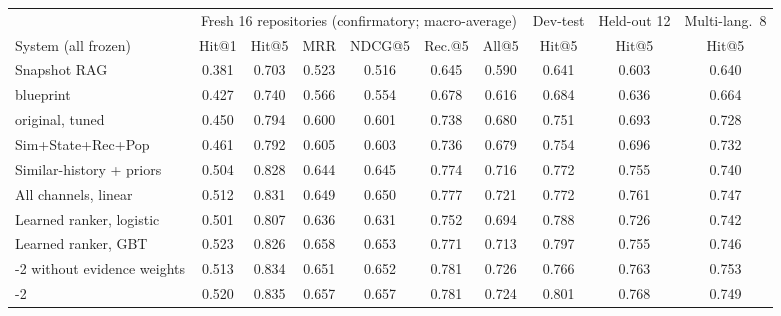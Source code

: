 \begin{tabular}{lcccccc|ccc}
\toprule
 & \multicolumn{6}{c|}{Fresh 16 repositories (confirmatory; macro-average)} & Dev-test & Held-out 12 & Multi-lang.\ 8 \\
System (all frozen) & Hit@1 & Hit@5 & MRR & NDCG@5 & Rec.@5 & All@5 & Hit@5 & Hit@5 & Hit@5 \\
\midrule
Snapshot RAG & 0.381 & 0.703 & 0.523 & 0.516 & 0.645 & 0.590 & 0.641 & 0.603 & 0.640 \\
\midrule
\sys{} blueprint & 0.427 & 0.740 & 0.566 & 0.554 & 0.678 & 0.616 & 0.684 & 0.636 & 0.664 \\
\sys{} original, tuned & 0.450 & 0.794 & 0.600 & 0.601 & 0.738 & 0.680 & 0.751 & 0.693 & 0.728 \\
\midrule
Sim+State+Rec+Pop & 0.461 & 0.792 & 0.605 & 0.603 & 0.736 & 0.679 & 0.754 & 0.696 & 0.732 \\
Similar-history + priors & 0.504 & 0.828 & 0.644 & 0.645 & 0.774 & 0.716 & 0.772 & 0.755 & 0.740 \\
All channels, linear & 0.512 & 0.831 & 0.649 & 0.650 & 0.777 & 0.721 & 0.772 & 0.761 & 0.747 \\
Learned ranker, logistic & 0.501 & 0.807 & 0.636 & 0.631 & 0.752 & 0.694 & 0.788 & 0.726 & 0.742 \\
Learned ranker, GBT & 0.523 & 0.826 & 0.658 & 0.653 & 0.771 & 0.713 & 0.797 & 0.755 & 0.746 \\
\midrule
\sys{}-2 without evidence weights & 0.513 & 0.834 & 0.651 & 0.652 & 0.781 & 0.726 & 0.766 & 0.763 & 0.753 \\
\sys{}-2 & 0.520 & 0.835 & 0.657 & 0.657 & 0.781 & 0.724 & 0.801 & 0.768 & 0.749 \\
\bottomrule
\end{tabular}